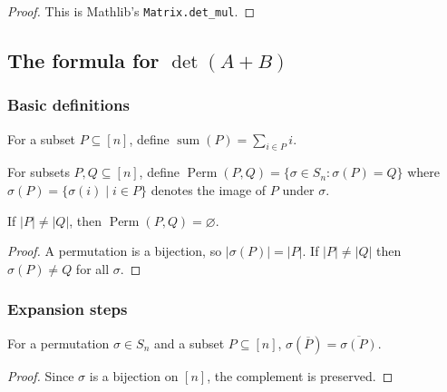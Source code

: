 \begin{proof}
\leanok
This is Mathlib's \texttt{Matrix.det\_mul}.
\end{proof}

\subsection{The formula for $\det(A+B)$}

\subsubsection{Basic definitions}

\begin{definition}
\label{def.finsetSumFin}
\leanhelper
\leanok
For a subset $P\subseteq [n]$, define
$\operatorname{sum}(P) = \sum_{i\in P} i$.

For subsets $P,Q\subseteq [n]$, define
$\operatorname{Perm}(P,Q) = \{\sigma\in S_n : \sigma(P)=Q\}$
where $\sigma(P) = \{\sigma(i) \mid i \in P\}$
denotes the image of $P$ under $\sigma$.
\end{definition}

\begin{lemma}
\label{lem.permsMapping.empty}
\leanhelper
\leanok
If $|P| \ne |Q|$, then $\operatorname{Perm}(P,Q) = \varnothing$.
\end{lemma}

\begin{proof}
\leanok
A permutation is a bijection, so $|\sigma(P)| = |P|$. If $|P|\ne|Q|$
then $\sigma(P) \ne Q$ for all $\sigma$.
\end{proof}

\subsubsection{Expansion steps}

\begin{lemma}
\label{lem.imageFinset.compl}
\leanhelper
\leanok
For a permutation $\sigma\in S_n$ and a subset $P\subseteq [n]$,
$\sigma(\overline{P}) = \overline{\sigma(P)}$.
\end{lemma}

\begin{proof}
\leanok
Since $\sigma$ is a bijection on $[n]$, the complement is preserved.
\end{proof}

